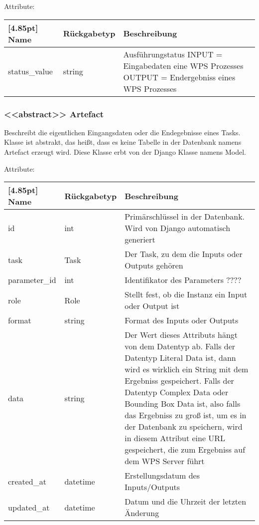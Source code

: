 			Attribute:
			\begin{center}
				\setlength\tabcolsep{5pt}
				\renewcommand{\arraystretch}{1.5}
				
				\begin{tabularx}{\textwidth}{|l|l|X|}
					\hline
					\rowcolor[gray]{0.75}[4.85pt]
					Name & Rückgabetyp & Beschreibung \\ \hline 
	           		status\_value & string & Ausführungstatus\newline
	           		INPUT = Eingabedaten eine WPS Prozesses \newline
	           		OUTPUT = Endergebniss eines WPS Prozesses \\ \hline
				\end{tabularx}
			\end{center}
        \subsubsection{<<abstract>> Artefact}
			Beschreibt die eigentlichen Eingangsdaten oder die Endegebnisse eines Tasks. Klasse ist abstrakt, das heißt, dass es keine Tabelle in der Datenbank namens \glqq Artefact \grqq erzeugt wird. \newline 
			Diese Klasse erbt von der Django Klasse namens \glqq Model\grqq .
			
			Attribute:
			\begin{center}
				\setlength\tabcolsep{5pt}
				\renewcommand{\arraystretch}{1.5}
				
				\begin{tabularx}{\textwidth}{|l|l|X|}
					\hline
					\rowcolor[gray]{0.75}[4.85pt]
					Name & Rückgabetyp & Beschreibung \\ \hline 
					id & int & Primärschlüssel in der Datenbank. Wird von Django automatisch generiert \\ \hline
					task & Task & Der Task, zu dem die Inputs oder Outputs gehören\\ \hline
					parameter\_id & int & Identifikator des Parameters ???? \\ \hline
					role & Role & Stellt fest, ob die Instanz ein Input oder Output ist \\ \hline
					format & string & Format des Inputs oder Outputs \\ \hline
					data & string & Der Wert dieses Attributs hängt von dem Datentyp ab. Falls der Datentyp Literal Data ist, dann wird es wirklich ein String mit dem Ergebniss gespeichert. Falls der Datentyp Complex Data oder Bounding Box Data ist, also falls das Ergebniss zu groß ist, um es in der Datenbank zu speichern, wird in diesem Attribut eine URL gespeichert, die zum Ergebniss auf dem WPS Server führt \\ \hline
					created\_at & datetime & Erstellungsdatum des Inputs/Outputs \\ \hline
					updated\_at & datetime & Datum und die Uhrzeit der letzten Änderung \\ \hline
				\end{tabularx}
			\end{center}
